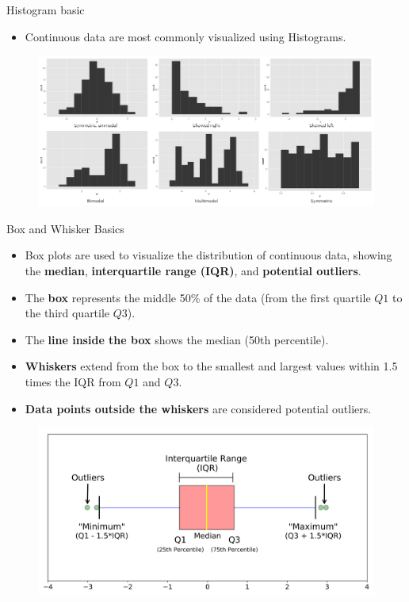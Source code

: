 \documentclass[
  ignorenonframetext,
]{beamer}
\providecommand{\tightlist}{%
  \setlength{\itemsep}{0pt}\setlength{\parskip}{0pt}}
\begin{document}
\begin{frame}{Histogram basic}
\label{histogram-basic}
\begin{itemize}
\tightlist
\item
  Continuous data are most commonly visualized using Histograms.
\end{itemize}

\begin{figure}

{\centering \includegraphics[width=0.8\linewidth]{fig/Histogram} 

}

\end{figure}
\end{frame}

\begin{frame}{Box and Whisker Basics}
\label{box-and-whisker-basics}
\begin{itemize}
\tightlist
\item
  Box plots are used to visualize the distribution of continuous data,
  showing the \textbf{median}, \textbf{interquartile range (IQR)}, and
  \textbf{potential outliers}.
\item
  The \textbf{box} represents the middle 50\% of the data (from the
  first quartile \(Q1\) to the third quartile \(Q3\)).
\item
  The \textbf{line inside the box} shows the median (50th percentile).
\item
  \textbf{Whiskers} extend from the box to the smallest and largest
  values within 1.5 times the IQR from \(Q1\) and \(Q3\).
\item
  \textbf{Data points outside the whiskers} are considered potential
  outliers.
\end{itemize}

\begin{figure}

{\centering \includegraphics[width=0.6\linewidth]{fig/box} 

}

\end{figure}
\end{frame}
\end{document}
